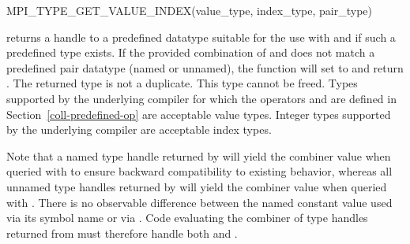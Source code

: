 \begin{funcdef}{MPI\_TYPE\_GET\_VALUE\_INDEX}{(\mbox{value\_type}, \mbox{index\_type}, \mbox{pair\_type})}
\end{funcdef}

 returns a handle to a predefined datatype suitable for the use with  and  if such a predefined type exists.
If the provided combination of  and  does not match a predefined pair datatype (named or unnamed), the function will set  to  and return .
The returned type is not a duplicate.
This type cannot be freed.
Types supported by the underlying compiler for which the operators  and  are defined in Section~\ref{coll-predefined-op} are acceptable value types.
Integer types supported by the underlying compiler are acceptable index types.

\begin{sloppy}
\begin{users}
    Note that a named type handle returned by  will yield the combiner value  when queried with  to ensure backward compatibility to existing behavior, whereas all unnamed type handles returned by  will yield the combiner value  when queried with .
    There is no observable difference between the named constant value used via its symbol name or via .
    Code evaluating the combiner of type handles returned from  must therefore handle both  and .
\end{users}
\end{sloppy}


